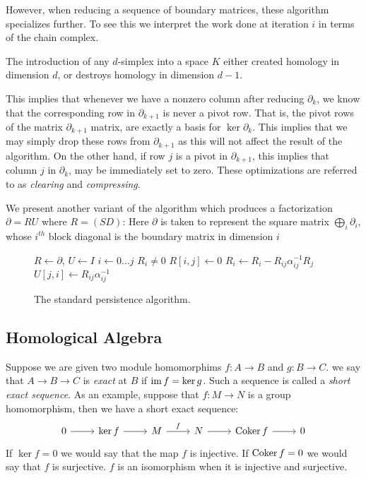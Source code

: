 However, when reducing a sequence of boundary matrices, these algorithm specializes further. To see this we interpret the work done at iteration $i$ in terms of the chain complex. 
\begin{lemma}
The introduction of any $d$-simplex into a space $K$ either created homology in dimension $d$, or destroys homology in dimension $d-1$.
\end{lemma}
This implies that whenever we have a nonzero column after reducing $\partial_k$, we know that the corresponding row in $\partial_{k+1}$ is never a pivot row. That is, the pivot rows of the matrix $\partial_{k+1}$ matrix, are exactly a basis for $\ker{\partial_k}$. This implies that we may simply drop these rows from $\partial_{k+1}$ as this will not affect the result of the algorithm. On the other hand, if row $j$ is a pivot in $\partial_{k+1}$, this implies that column $j$ in $\partial_k$, may be immediately set to zero. These optimizations are referred to as \emph{clearing} and \emph{compressing}.

We present another variant of the algorithm which produces a factorization $\partial = RU$ where $R = (SD)$: Here $\partial$ is taken to represent the square matrix $\bigoplus_i \partial_i$, whose $i^{th}$ block diagonal is the boundary matrix in dimension $i$
\begin{figure}
\begin{codebox}
\li $R \gets \partial$, $U \gets I$
\li {}
\li \For $i \gets 0 \ldots j$ 
\li \If $R_i \neq 0$
\li $R[i,j] \gets 0$
\li \End
\li \Do {}
\li \Do
\li   $R_i \gets R_i - R_{ij}\alpha^{-1}_{ij}R_j$
\li   $U[j,i] \gets R_{ij}\alpha^{-1}_{ij}$
    \End
\End
\end{codebox}
\caption{The standard persistence algorithm.}
\label{alg:elz}
\end{figure}

\subsection{Homological Algebra} 
Suppose we are given two module homomorphims $f: A \rightarrow B$ and $g: B \rightarrow C$. we say that $A \rightarrow B \rightarrow C$
is \emph{exact} at $B$ if $\operatorname{im}{f} =  \ker{g}$. Such a sequence is called a \emph{short exact sequence}. As an example, suppose that $f: M \rightarrow N$ is a group homomorphism, then we have a short exact sequence:
\[ 
\begin{tikzcd}
0 \arrow{r} & \ker{f} \arrow{r} & M \arrow{r}{f} & N \arrow{r} & \coker{f} \arrow{r}& 0
\end{tikzcd}
\] 
If $\ker{f} = 0$ we would say that the map $f$ is injective. If $\operatorname{Coker}{f} = 0$ we would say that $f$ is surjective. $f$ is an isomorphism when it is injective and surjective. 

